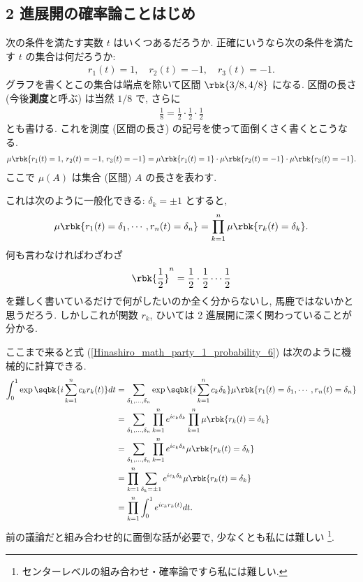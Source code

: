 \documentclass[openany, a4paper, oneside]{jsbook}
\begin{document}
\subsection{2 進展開の確率論ことはじめ \label{Hinashiro_math_party_1_probability_14}}

次の条件を満たす実数 $t$ はいくつあるだろうか.
正確にいうなら次の条件を満たす $t$ の集合は何だろうか:
\begin{align}
 r_1 (t) = 1,
 \quad r_2 (t) = -1,
 \quad r_3 (t) = -1.
\end{align}
グラフを書くとこの集合は端点を除いて区間 $\rbk{3/8, 4/8}$ になる.
区間の長さ (今後\textbf{測度}と呼ぶ) は当然 $1/8$ で, さらに
\begin{align}
 \frac{1}{8}
 =
 \frac{1}{2} \cdot \frac{1}{2} \cdot \frac{1}{2}
\end{align}
とも書ける.
これを測度 (区間の長さ) の記号を使って面倒くさく書くとこうなる.
\begin{align}
 \mu \rbk{r_1 (t) = 1, \, r_2 (t) = -1, \, r_3 (t) = -1}
 =
 \mu \rbk{r_1 (t)=1} \cdot \mu \rbk{r_2 (t)=-1} \cdot \mu \rbk{r_3 (t)=-1}.
\end{align}
ここで $\mu (A)$ は集合 (区間) $A$ の長さを表わす.

これは次のように一般化できる: $\delta_k = \pm 1$ とすると,
\begin{align}
 \mu \rbk{r_1 (t) = \delta_1, \cdots, r_n (t) = \delta_n}
 =
 \prod_{k=1}^{n} \mu \rbk{r_k (t)=\delta_k}. \label{Hinashiro_math_party_1_probability_7}
\end{align}
何も言わなければわざわざ
\begin{align}
 \rbk{\frac{1}{2}}^n
 =
 \frac{1}{2} \cdot \frac{1}{2} \cdots \frac{1}{2}
\end{align}
を難しく書いているだけで何がしたいのか全く分からないし, 馬鹿ではないかと思うだろう.
しかしこれが関数 $r_k$, ひいては 2 進展開に深く関わっていることが分かる.

ここまで来ると式 (\ref{Hinashiro_math_party_1_probability_6}) は次のように機械的に計算できる.
\begin{align}
 \int_0^1 \exp \sqbk{i \sum_{k=1}^n c_k r_k (t)} dt
 &=
 \sum_{\delta_1,\dots,\delta_n} \exp \sqbk{i \sum_{k=1}^{n} c_k \delta_k} \mu \rbk{r_1 (t) = \delta_1, \cdots, r_n (t) = \delta_n} \\
 &=
 \sum_{\delta_1,\dots,\delta_n} \prod_{k=1}^n e^{i c_k \delta_k} \prod_{k=1}^n \mu \rbk{r_k (t) = \delta_k} \\
 &=
 \sum_{\delta_1,\dots,\delta_n} \prod_{k=1}^n e^{i c_k \delta_k} \mu \rbk{r_k (t) = \delta_k} \\
 &=
 \prod_{k=1}^n \sum_{\delta_k = \pm 1} e^{i c_k \delta_k} \mu \rbk{r_k (t) = \delta_k} \\
 &=
 \prod_{k=1}^n \int_0^1 e^{i c_k r_k (t)} dt.
\end{align}
前の議論だと組み合わせ的に面倒な話が必要で, 少なくとも私には難しい \footnote{センターレベルの組み合わせ・確率論ですら私には難しい.}.
\end{document}
